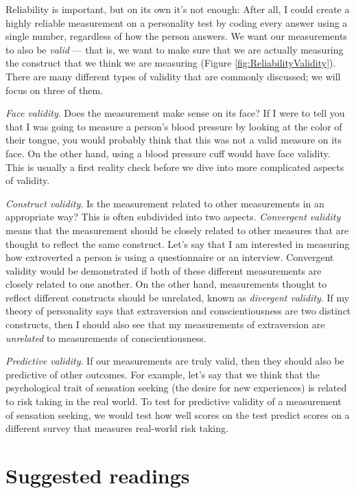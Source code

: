 \documentclass[]{book}
\theoremstyle{definition}
\theoremstyle{definition}
\theoremstyle{definition}
\theoremstyle{remark}
\begin{document}
Reliability is important, but on its own it's not enough: After all, I
could create a highly reliable measurement on a personality test by
coding every answer using a single number, regardless of how the person
answers. We want our measurements to also be \emph{valid} --- that is,
we want to make sure that we are actually measuring the construct that
we think we are measuring (Figure \ref{fig:ReliabilityValidity}). There
are many different types of validity that are commonly discussed; we
will focus on three of them.

\emph{Face validity}. Does the measurement make sense on its face? If I
were to tell you that I was going to measure a person's blood pressure
by looking at the color of their tongue, you would probably think that
this was not a valid measure on its face. On the other hand, using a
blood pressure cuff would have face validity. This is usually a first
reality check before we dive into more complicated aspects of validity.

\emph{Construct validity}. Is the measurement related to other
measurements in an appropriate way? This is often subdivided into two
aspects. \emph{Convergent validity} means that the measurement should be
closely related to other measures that are thought to reflect the same
construct. Let's say that I am interested in measuring how extroverted a
person is using a questionnaire or an interview. Convergent validity
would be demonstrated if both of these different measurements are
closely related to one another. On the other hand, measurements thought
to reflect different constructs should be unrelated, known as
\emph{divergent validity}. If my theory of personality says that
extraversion and conscientiousness are two distinct constructs, then I
should also see that my measurements of extraversion are
\emph{unrelated} to measurements of conscientiousness.

\emph{Predictive validity}. If our measurements are truly valid, then
they should also be predictive of other outcomes. For example, let's say
that we think that the psychological trait of sensation seeking (the
desire for new experiences) is related to risk taking in the real world.
To test for predictive validity of a measurement of sensation seeking,
we would test how well scores on the test predict scores on a different
survey that measures real-world risk taking.

\section{Suggested readings}\label{suggested-readings-1}
\end{document}

